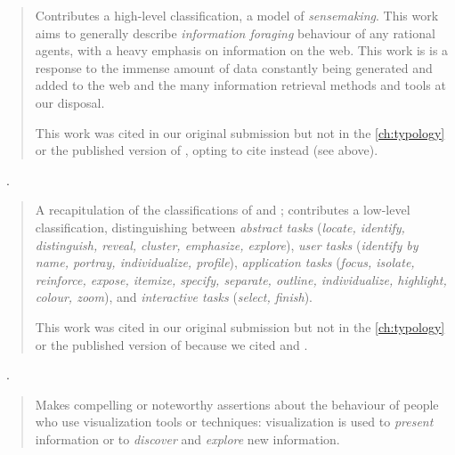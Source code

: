 \begin{quotation}
    Contributes a high-level classification, a model of {\it sensemaking}. 
    This work aims to generally describe {\it information foraging} behaviour of any rational agents, with a heavy emphasis on information on the web. 
    This work is is a response to the immense amount of data constantly being generated and added to the web and the many information retrieval methods and tools at our disposal.
    
    This work was cited in our original submission but not in the \autoref{ch:typology} or the published version of \citet{Brehmer2013}, opting to cite \citet{Pirolli2005} instead (see above).
\end{quotation}

\begin{sloppypar}
~\cite{Winckler2004}. \end{sloppypar}

\begin{quotation}
    A recapitulation of the classifications of \citet{Wehrend1990} and \citet{Zhou1998}; contributes a low-level classification,
    distinguishing between {\it abstract tasks} ({\it locate, identify, distinguish, reveal, cluster, emphasize, explore}), {\it user tasks} ({\it identify by name, portray, individualize, profile}), {\it application tasks} ({\it focus, isolate, reinforce, expose, itemize, specify, separate, outline, individualize, highlight, colour, zoom}), and {\it interactive tasks} ({\it select, finish}).
    
    This work was cited in our original submission but not in the  \autoref{ch:typology} or the published version of \citet{Brehmer2013} because we cited \citet{Wehrend1990} and \citet{Zhou1998}.
\end{quotation}

\begin{sloppypar}
~\cite{vanWijk2006}. \end{sloppypar}

\begin{quotation}
    Makes compelling or noteworthy assertions about the behaviour of people who use visualization tools or techniques: visualization is used to {\it present} information or to {\it discover} and {\it explore} new information.
\end{quotation}

